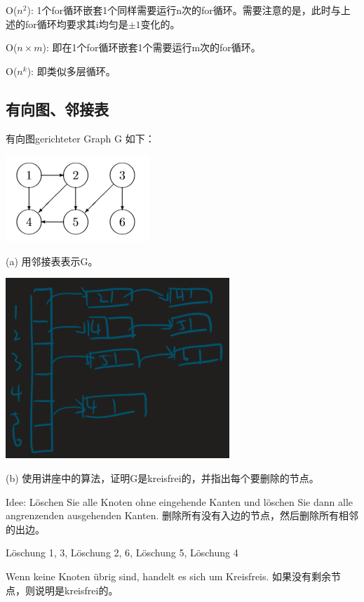 \documentclass[a4paper]{article}    %
\begin{document}
O($n^2$): 1个for循环嵌套1个同样需要运行n次的for循环。需要注意的是，此时与上述的for循环均要求其i均匀是$\pm 1$变化的。

O($n \times m$): 即在1个for循环嵌套1个需要运行m次的for循环。

O($n^k$): 即类似多层循环。

\subsection{有向图、邻接表} 

\noindent 有向图gerichteter Graph G 如下：

\begin{center}
    \includegraphics[scale=0.6]{1.png}
\end{center}

(a)	用邻接表表示G。

\begin{center}
    \includegraphics[scale=0.6]{2.png}
\end{center}

(b)	使用讲座中的算法，证明G是kreisfrei的，并指出每个要删除的节点。

Idee: Löschen Sie alle Knoten ohne eingehende Kanten und löschen Sie dann alle angrenzenden ausgehenden Kanten.
删除所有没有入边的节点，然后删除所有相邻的出边。

Löschung {1, 3}, Löschung {2, 6}, Löschung {5}, Löschung {4}

Wenn keine Knoten übrig sind, handelt es sich um Kreisfreis.
如果没有剩余节点，则说明是kreisfrei的。
\end{document}
